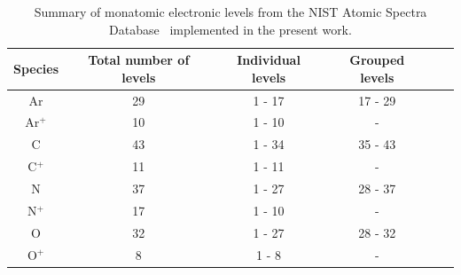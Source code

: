 
\begin{table}[h]
 \center
 \caption{Summary of monatomic electronic levels from the NIST Atomic Spectra Database~\cite{NIST_ASD} implemented in the present work.}
 \label{tab:atomic-levels-and-lines}
 \begin{tabular*}{0.8\textwidth}{cccccc}
  \hline Species                          & Total number of levels  & Individual levels  & Grouped levels        \\
  \hline  
                  Ar                               & 29                                      &   1 - 17                   & 17 - 29 \\ 
                  Ar$^+$                      & 10                                        & 1 - 10                        & - \\ 
                  C                                & 43                                      &  1 - 34                    & 35 - 43 \\
                  C$^+$                       & 11                                      &  1 - 11                    & - \\
                  N                                &  37                                     & 1 - 27                     & 28 - 37 \\
                  N$^+$                       &  17                                     & 1 - 10                     & - \\
                  O                               &   32                                     & 1 - 27                     & 28 - 32 \\
                  O$^+$                      &  8                                        & 1 - 8                        & - \\ 
  \hline
 \end{tabular*}
\end{table}

